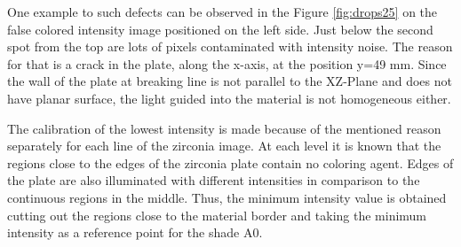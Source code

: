 One example to such defects can be observed in the Figure \ref{fig:drops25} on the false colored intensity image positioned on the left side. Just below the second spot from the top are lots of pixels contaminated with intensity noise. The reason for that is a crack in the plate, along the x-axis, at the position y=49 mm. Since the wall of the plate at breaking line is not parallel to the XZ-Plane and does not have planar surface, the light guided into the material is not homogeneous either. 

The calibration of the lowest intensity is made because of the mentioned reason separately for each line of the zirconia image. At each level it is known that the regions close to the edges of the zirconia plate contain no coloring agent. Edges of the plate are also illuminated with different intensities in comparison to the continuous regions in the middle. Thus, the minimum intensity value is obtained cutting out the regions close to the material border and taking  the minimum intensity as a reference point for the shade A0.
\bigskip

